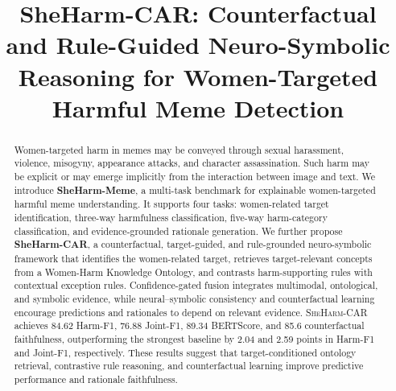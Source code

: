 \documentclass[11pt]{article}
\title{SheHarm-CAR: Counterfactual and Rule-Guided Neuro-Symbolic Reasoning for Women-Targeted Harmful Meme Detection}
\begin{document}
\maketitle
\begin{abstract}
Women-targeted harm in memes may be conveyed through sexual
harassment, violence, misogyny, appearance attacks, and character
assassination. Such harm may be explicit or may emerge implicitly
from the interaction between image and text. We introduce
\textbf{SheHarm-Meme}, a multi-task benchmark for explainable
women-targeted harmful meme understanding. It supports four tasks:
women-related target identification, three-way harmfulness
classification, five-way harm-category classification, and
evidence-grounded rationale generation. We further propose
\textbf{SheHarm-CAR}, a counterfactual, target-guided, and
rule-grounded neuro-symbolic framework that identifies the
women-related target, retrieves target-relevant concepts from a
Women-Harm Knowledge Ontology, and contrasts harm-supporting rules
with contextual exception rules. Confidence-gated fusion integrates
multimodal, ontological, and symbolic evidence, while
neural--symbolic consistency and counterfactual learning encourage
predictions and rationales to depend on relevant evidence.
\textsc{SheHarm-CAR} achieves 84.62 Harm-F1, 76.88 Joint-F1,
89.34 BERTScore, and 85.6 counterfactual faithfulness, outperforming
the strongest baseline by 2.04 and 2.59 points in Harm-F1 and
Joint-F1, respectively. These results suggest that target-conditioned
ontology retrieval, contrastive rule reasoning, and counterfactual
learning improve predictive performance and rationale faithfulness.
\end{abstract}
\end{document}
